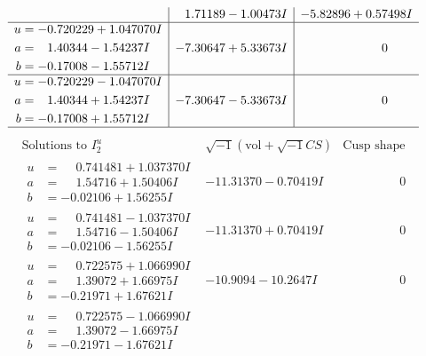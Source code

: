 \documentclass[1p]{elsarticle_modified}
\theoremstyle{definition}
\newcommand{\I}{\sqrt{-1}}
\begin{document}
$$\begin{array}{c|c|c}
 & \phantom{-}1.71189 - 1.00473 I & -5.82896 + 0.57498 I \\ \hline\begin{aligned}
u &= -0.720229 + 1.047070 I \\
a &= \phantom{-}1.40344 - 1.54237 I \\
b &= -0.17008 - 1.55712 I\end{aligned}
 & -7.30647 + 5.33673 I & \phantom{-0.000000 } 0 \\ \hline\begin{aligned}
u &= -0.720229 - 1.047070 I \\
a &= \phantom{-}1.40344 + 1.54237 I \\
b &= -0.17008 + 1.55712 I\end{aligned}
 & -7.30647 - 5.33673 I & \phantom{-0.000000 } 0\\
 \hline 
 \end{array}$$\newpage$$\begin{array}{c|c|c}  
\text{Solutions to }I^u_{2}& \I (\text{vol} + \sqrt{-1}CS) & \text{Cusp shape}\\
 \hline 
\begin{aligned}
u &= \phantom{-}0.741481 + 1.037370 I \\
a &= \phantom{-}1.54716 + 1.50406 I \\
b &= -0.02106 + 1.56255 I\end{aligned}
 & -11.31370 - 0.70419 I & \phantom{-0.000000 } 0 \\ \hline\begin{aligned}
u &= \phantom{-}0.741481 - 1.037370 I \\
a &= \phantom{-}1.54716 - 1.50406 I \\
b &= -0.02106 - 1.56255 I\end{aligned}
 & -11.31370 + 0.70419 I & \phantom{-0.000000 } 0 \\ \hline\begin{aligned}
u &= \phantom{-}0.722575 + 1.066990 I \\
a &= \phantom{-}1.39072 + 1.66975 I \\
b &= -0.21971 + 1.67621 I\end{aligned}
 & -10.9094 - 10.2647 I & \phantom{-0.000000 } 0 \\ \hline\begin{aligned}
u &= \phantom{-}0.722575 - 1.066990 I \\
a &= \phantom{-}1.39072 - 1.66975 I \\
b &= -0.21971 - 1.67621 I\end{aligned}

\end{array}$$
\end{document}
